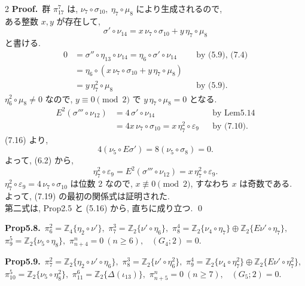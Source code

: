 \documentclass[10pt, leqno]{ltjsarticle}
\newcommand{\gen}[1]{\{#1\}}       %
\newcommand{\pit}[2]{\pi_{#1}^{#2}}
\numberwithin{equation}{section}
\theoremstyle{plain}
\theoremstyle{definition}
\theoremstyle{remark}
\begin{document}
\begin{paracol}{2}
\noindent
\textbf{Proof.}\
群 \(\pit{17}{7}\) は,
\(\nu_{7}\circ\sigma_{10},\ \eta_{7}\circ\mu_{8}\) により生成されるので, \\
ある整数 \(x,y\) が存在して,
\[
\sigma'\circ \nu_{14}=x\,\nu_{7}\circ\sigma_{10}+y\,\eta_{7}\circ\mu_{8}
\]
と書ける.
\[
\begin{align*}
  0 & = \sigma''\circ\eta_{13}\circ \nu_{14} 
    = \eta_{6}\circ\sigma'\circ \nu_{14} 
    && \text{by (5.9), (7.4)}\\
    & = \eta_{6}\circ(x\,\nu_{7}\circ\sigma_{10}+y\,\eta_{7}\circ\mu_{8}) \\
    & = y\,\eta_{7}^{2}\circ\mu_{8} 
    && \text{by (5.9)}.
\end{align*}
\]
\(\eta_{6}^{2}\circ\mu_{8}\ne0\) なので,
\(y\equiv0\pmod2\) で \(y\,\eta_{7}\circ\mu_{8}=0\) となる. 
\[
\begin{align*}
E^{2}(\sigma'''\circ \nu_{12})
  & = 4\,\sigma'\circ \nu_{14} 
  && \text{by Lem5.14} \\
  & = 4x\,\nu_{7}\circ\sigma_{10}=x\,\eta_{7}^{2}\circ\varepsilon_{9} 
  && \text{by (7.10)}.
\end{align*}
\]
(7.16) より,
\[
4(\nu_{5}\circ E\sigma')=8(\nu_{5}\circ\sigma_{8})=0.
\]
よって, (6.2) から, 
\[
\eta_{7}^{2}\circ\varepsilon_{9}
=E^{2}(\sigma'''\circ \nu_{12})
=x\,\eta_{7}^{2}\circ\varepsilon_{9}.
\] 
\(\eta_{7}^{2}\circ\varepsilon_{9}=4\,\nu_{7}\circ\sigma_{10}\) は位数 2 なので,
\(x\not\equiv0\pmod2\), すなわち \(x\) は奇数である. \\
よって, (7.19) の最初の関係式は証明された.\\
第二式は, Prop2.5 と (5.16) から, 直ちに成り立つ. 
\qed

\switchcolumn

\noindent
\textbf{Prop5.8.}\
\(\pi^{2}_{6}=\mathbb Z_4\gen{\eta_{2}\circ\nu'},\) \quad
\(\pi^{3}_{7}=\mathbb Z_2\gen{\nu'\circ\eta_6},\) \quad
\(\pi^{4}_{8}=\mathbb Z_2\gen{\nu_{4}\circ\eta_7}\oplus \mathbb Z_2\gen{E\nu'\circ\eta_7},\) \\
\(\pi^{5}_{9}=\mathbb Z_2\gen{\nu_{5}\circ\eta_8},\) \quad
\(\pi^{n}_{n+4}=0\ (n\ge6),\) \
\((G_{4};2)=0.\)

\noindent
\textbf{Prop5.9.}\
\(\pi^{2}_{7}=\mathbb Z_2\gen{\eta_{2}\circ\nu'\circ\eta_6},\) \quad
\(\pi^{3}_{8}=\mathbb Z_2\gen{\nu'\circ\eta_6^2},\) \quad
\(\pi^{4}_{9}=\mathbb Z_2\gen{\nu_{4}\circ\eta_7^2}\oplus \mathbb Z_2\gen{E\nu'\circ\eta_7^2},\) \\
\(\pi^{5}_{10}=\mathbb Z_2\gen{\nu_{5}\circ\eta_8^2},\) \quad
\(\pi^{6}_{11}=\mathbb Z_2\gen{\Delta(\iota_{13})},\) \quad
\(\pi^{n}_{n+5}=0\ (n\ge7),\) \
\((G_{5};2)=0.\)


\end{paracol}
\end{document}
